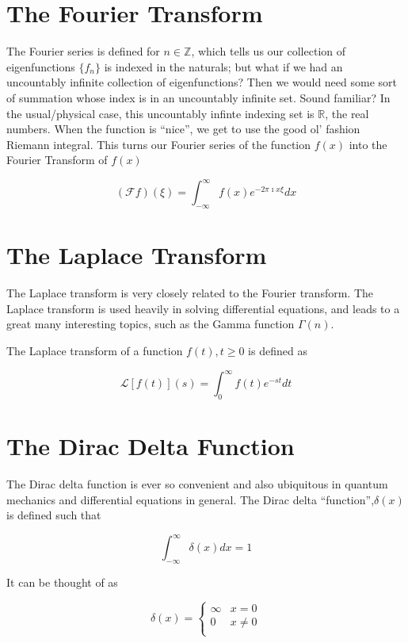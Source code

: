\documentclass[11pt,letterpaper,twoside,titlepage]{book}
\begin{document}
			\section{The Fourier Transform}
			
				The Fourier series is defined for $n \in \mathbb{Z}$, which tells us our collection of eigenfunctions $\{f_n\}$ is indexed in the naturals; but what if we had an uncountably infinite collection of eigenfunctions?  Then we would need some sort of summation whose index is in an uncountably infinite set.  Sound familiar?  In the usual/physical case, this uncountably infinte indexing set is $\mathbb{R}$, the real numbers.  When the function is ``nice'', we get to use the good ol' fashion Riemann integral.  This turns our Fourier series of the function $f(x)$ into the Fourier Transform of $f(x)$
				
				\[ (\mathcal{F}f)(\xi) = \int_{-\infty}^\infty f(x) e^{-2\pi \imath x \xi } dx \]
				
			\section{The Laplace Transform}
			
				The Laplace transform is very closely related to the Fourier transform.  The Laplace transform is used heavily in solving differential equations, and leads to a great many interesting topics, such as the Gamma function $\Gamma(n)$.  
				
				The Laplace transform of a function $f(t), t \geq 0$ is defined as 
				
				\[ \mathcal{L}[ f(t) ](s) = \int_0^\infty f(t) e^{-s t} dt \]
					
			\section{The Dirac Delta Function}
			
				The Dirac delta function is ever so convenient and also ubiquitous in quantum mechanics and differential equations in general.  The Dirac delta ``function'',$\delta(x)$ is defined such that
				
				\[ \int_{-\infty}^\infty \delta(x) dx = 1 \]
				
				It can be thought of  as 
				
				\[ \delta(x) = \begin{cases}
								\infty & x = 0  \\
								0 & x \neq 0 \\
				 			\end{cases}
				\]
				
\end{document}
